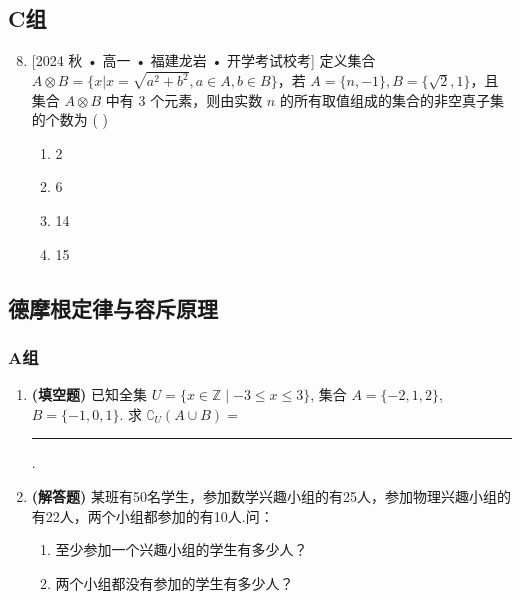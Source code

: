 \documentclass[12pt,a4paper]{ctexbook}
\theoremstyle{definition}
\theoremstyle{remark}
\begin{document}
	\subsection*{C组}
	\begin{enumerate}
		\setcounter{enumi}{7}
		\item {[2024 秋 • 高一 • 福建龙岩 • 开学考试校考]} 定义集合 $A \otimes B = \{x | x=\sqrt{a^2+b^2}, a \in A, b \in B\}$，若 $A=\{n, -1\}, B=\{\sqrt{2}, 1\}$，且集合 $A \otimes B$ 中有 3 个元素，则由实数 $n$ 的所有取值组成的集合的非空真子集的个数为 ( \hspace{2cm} )
		\begin{enumerate}
			\item 2
			\item 6
			\item 14
			\item 15
		\end{enumerate}
	\end{enumerate}
	
	\subsection*{德摩根定律与容斥原理}
	
	\subsubsection*{A组}
	\begin{enumerate}
		\item \textbf{(填空题)} 已知全集 $U=\{x \in \mathbb{Z} \mid -3 \le x \le 3\}$, 集合 $A=\{-2, 1, 2\}$, $B=\{-1, 0, 1\}$. 求 $\complement_U(A \cup B) = $ \rule{3cm}{0.5pt}.
		
		\item \textbf{(解答题)} 某班有50名学生，参加数学兴趣小组的有25人，参加物理兴趣小组的有22人，两个小组都参加的有10人.问：
		\begin{enumerate}
			\item 至少参加一个兴趣小组的学生有多少人？
			\item 两个小组都没有参加的学生有多少人？
		\end{enumerate}
	\end{enumerate}
	
\end{document}
